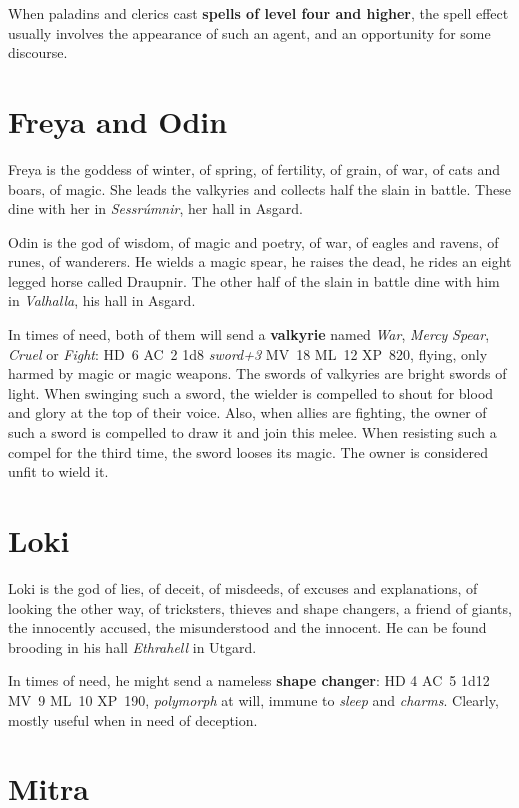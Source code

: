 \documentclass[a4paper,serif]{rpg-module}
\begin{document}
When paladins and clerics cast \textbf{spells of level four and
  higher}, the spell effect usually involves the appearance of such an
agent, and an opportunity for some discourse.

\section{Freya and Odin}

Freya is the goddess of winter, of spring, of fertility, of grain, of
war, of cats and boars, of magic. She leads the valkyries and collects
half the slain in battle. These dine with her in \emph{Sessrúmnir},
her hall in Asgard.

Odin is the god of wisdom, of magic and poetry, of war, of eagles and
ravens, of runes, of wanderers. He wields a magic spear, he raises the
dead, he rides an eight legged horse called Draupnir. The other half
of the slain in battle dine with him in \emph{Valhalla}, his hall in
Asgard.

In times of need, both of them will send a \textbf{valkyrie} named
\textit{War}, \textit{Mercy} \textit{Spear}, \textit{Cruel} or
\textit{Fight}: HD~6 AC~2 1d8 \textit{sword+3} MV~18 ML~12 XP~820,
flying, only harmed by magic or magic weapons. The swords of valkyries
are bright swords of light. When swinging such a sword, the wielder is
compelled to shout for blood and glory at the top of their voice.
Also, when allies are fighting, the owner of such a sword is compelled
to draw it and join this melee. When resisting such a compel for the
third time, the sword looses its magic. The owner is considered unfit
to wield it.

\section{Loki}

Loki is the god of lies, of deceit, of misdeeds, of excuses and
explanations, of looking the other way, of tricksters, thieves and
shape changers, a friend of giants, the innocently accused, the
misunderstood and the innocent. He can be found brooding in his hall
\emph{Ethrahell} in Utgard.

In times of need, he might send a nameless \textbf{shape changer}: HD
4 AC~5 1d12 MV~9 ML~10 XP~190, \textit{polymorph} at will, immune to
\textit{sleep} and \textit{charms}. Clearly, mostly useful when in
need of deception.

\section{Mitra}
\end{document}
